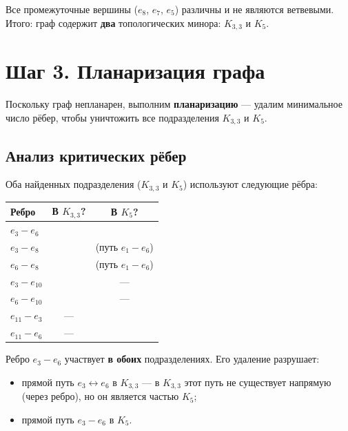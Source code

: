 \documentclass[a4paper,12pt]{article}
\begin{document}
Все промежуточные вершины ($e_8$, $e_7$, $e_5$) различны и не являются ветвевыми. \\
Итого: граф содержит \textbf{два} топологических минора: $K_{3,3}$ и $K_5$.

\section*{Шаг 3. Планаризация графа}

Поскольку граф непланарен, выполним \textbf{планаризацию} --- удалим минимальное
число рёбер, чтобы уничтожить все подразделения $K_{3,3}$ и $K_5$.

\subsection*{Анализ критических рёбер}

Оба найденных подразделения ($K_{3,3}$ и $K_5$) используют следующие рёбра:

\begin{center}
	\begin{tabular}{|l|c|c|}
		\hline
		\textbf{Ребро} & \textbf{В $K_{3,3}$?} & \textbf{В $K_5$?}  \\
		\hline
		$e_3 - e_6$    & \checkmark            & \checkmark         \\
		$e_3 - e_8$    & \checkmark            & (путь $e_1{-}e_6$) \\
		$e_6 - e_8$    & \checkmark            & (путь $e_1{-}e_6$) \\
		$e_3 - e_{10}$ & \checkmark            & ---                \\
		$e_6 - e_{10}$ & \checkmark            & ---                \\
		$e_{11} - e_3$ & ---                   & \checkmark         \\
		$e_{11} - e_6$ & ---                   & \checkmark         \\
		\hline
	\end{tabular}
\end{center}

Ребро $e_3 - e_6$ участвует \textbf{в обоих} подразделениях. Его удаление
разрушает:
\begin{itemize}
	\item прямой путь $e_3 \leftrightarrow e_6$ в $K_{3,3}$ --- в $K_{3,3}$ этот путь
	      не существует напрямую (через ребро), но он является частью $K_5$;
	\item прямой путь $e_3 - e_6$ в $K_5$.
\end{itemize}
\end{document}
